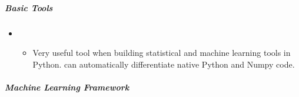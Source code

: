 \documentclass[letterpaper,10pt,english]{sphinxmanual}
\begin{document}
\subparagraph{Basic Tools}
\label{\detokenize{resource/research/machine_learning/machine_learning_tools:basic-tools}}\begin{itemize}
\item {} 
\begin{itemize}
\item {} 
Very useful tool when building statistical and machine learning
tools in Python.  can automatically differentiate
native Python and Numpy code.

\end{itemize}

\end{itemize}


\subparagraph{Machine Learning Framework}
\end{document}
